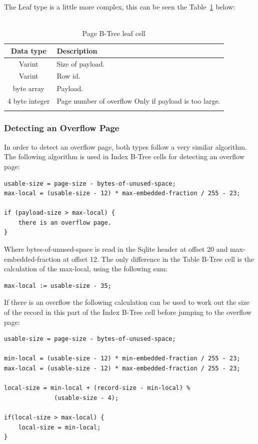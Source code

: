The Leaf type is a little more complex, this can be seen the Table~\ref{tbl:table_btree_cell_leaf} below:
\\\\
\begin{longtable}[h]{| c | p{5cm} |}
		\hline
			\textbf{Data type} & \textbf{Description} \\ 
		\hline
		\endhead
			Varint & Size of payload. \\
		\hline
			Varint & Row id. \\
		\hline
			byte array & Payload. \\
		\hline
			4 byte integer & Page number of overflow \newline
							  Only if payload is too large.\\
		\hline
	\caption{Page B-Tree leaf cell}
	\label{tbl:table_btree_cell_leaf}
\end{longtable}


\subsubsection{Detecting an Overflow Page}
\label{subsubsec:dec_overflow_page}

In order to detect an overflow page, both types follow a very similar algorithm. 
The following algorithm is used in Index B-Tree cells for detecting an overflow page:

\begin{lstlisting}	
usable-size = page-size - bytes-of-unused-space;
max-local = (usable-size - 12) * max-embedded-fraction / 255 - 23;

if (payload-size > max-local) {
	there is an overflow page.
}
\end{lstlisting}

Where bytes-of-unused-space is read in the Sqlite header at offset 20 and \newline max-embedded-fraction at offset 12. The only difference in the Table B-Tree cell is the calculation of the max-local, using the following sum:

\begin{lstlisting}	
max-local := usable-size - 35;
\end{lstlisting}

If there is an overflow the following calculation can be used to work out the size of the record in this part of the Index B-Tree cell before jumping to the overflow page:  

\begin{lstlisting}	
usable-size = page-size - bytes-of-unused-space;

min-local = (usable-size - 12) * min-embedded-fraction / 255 - 23;
max-local = (usable-size - 12) * max-embedded-fraction / 255 - 23;

local-size = min-local + (record-size - min-local) % 
			  (usable-size - 4);

if(local-size > max-local) {
	local-size = min-local;
}
\end{lstlisting}

